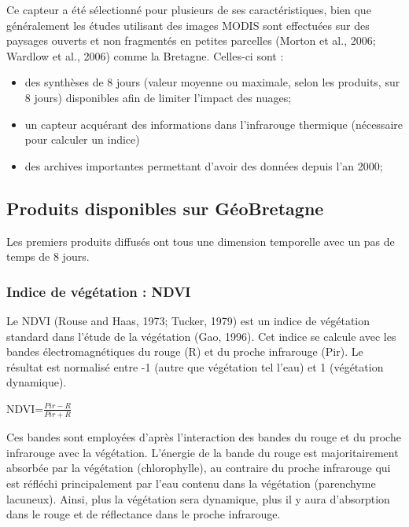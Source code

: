 \documentclass[10pt,a4paper]{article}
\begin{document}
Ce capteur a été sélectionné pour plusieurs de ses caractéristiques, bien que généralement les études utilisant des images MODIS sont effectuées sur des paysages ouverts et non fragmentés en petites parcelles (Morton et al., 2006; Wardlow et al., 2006) comme la Bretagne. Celles-ci sont :
\begin{itemize}
\item des synthèses de 8 jours (valeur moyenne ou maximale, selon les produits, sur 8 jours) disponibles afin de limiter l'impact des nuages;
\item un capteur acquérant des informations dans l'infrarouge thermique (nécessaire pour calculer un indice)
\item des archives importantes permettant d'avoir des données depuis l'an 2000;
\end{itemize}

\subsection{Produits disponibles sur GéoBretagne}

Les premiers produits diffusés ont tous une dimension temporelle avec un pas de temps de 8 jours.

\subsubsection{Indice de végétation : NDVI}

Le NDVI (Rouse and Haas, 1973; Tucker, 1979) est un indice de végétation standard dans l'étude de la végétation (Gao, 1996). Cet indice se calcule avec les bandes électromagnétiques du rouge (R) et du proche infrarouge (Pir). Le résultat est normalisé entre -1 (autre que végétation tel l'eau) et 1 (végétation dynamique).\smallbreak

\begin{center}
\textrm{NDVI}=$ \frac{Pir-R}{Pir+R} $
\end{center}\smallbreak

Ces bandes sont employées d'après l’interaction des bandes du rouge et du proche infrarouge avec la végétation. L'énergie de la bande du rouge est majoritairement absorbée par la végétation (chlorophylle), au contraire du proche infrarouge qui est réfléchi principalement par l'eau contenu dans la végétation (parenchyme lacuneux). Ainsi, plus la végétation sera dynamique, plus il y aura d'absorption dans le rouge et de réflectance dans le proche infrarouge.\smallbreak
\end{document}
